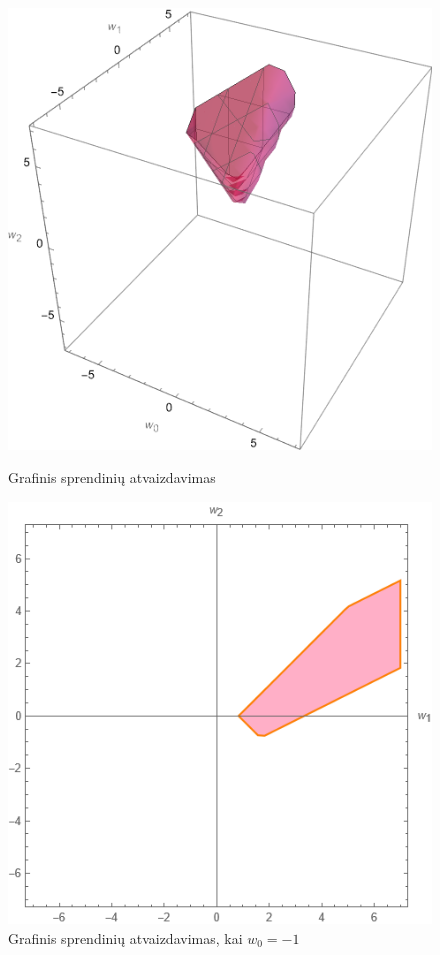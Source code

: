 \documentclass{VUMIFPSbakalaurinis}
\begin{document}
\begin{figure}[H]
  \begin{minipage}[c]{0.4\linewidth}
    \includegraphics[scale=0.5]{img/3d-2.png}
    \caption{Grafinis sprendinių atvaizdavimas}
    \label{img:visi-sprendiniai}
  \end{minipage}
  \hfill
  \begin{minipage}[c]{0.4\linewidth}
    \includegraphics[scale=0.5]{img/minus1.png}
    \caption{Grafinis sprendinių atvaizdavimas, kai $w_0 = -1$}
    \label{img:dalinis}
  \end{minipage}%
\end{figure}
\end{document}
